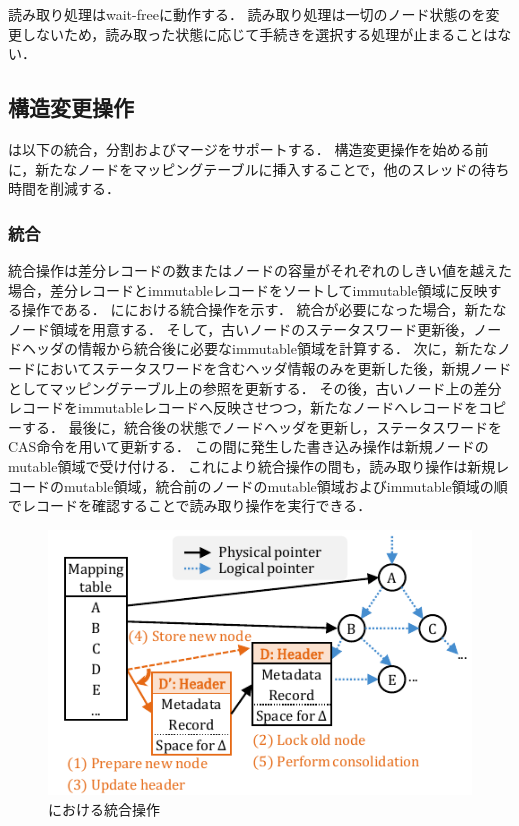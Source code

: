 読み取り処理はwait-freeに動作する．
読み取り処理は一切のノード状態のを変更しないため，読み取った状態に応じて手続きを選択する処理が止まることはない．

\subsection{構造変更操作}

\Bctree{}は以下の統合，分割およびマージをサポートする．
構造変更操作を始める前に，新たなノードをマッピングテーブルに挿入することで，他のスレッドの待ち時間を削減する．

\subsubsection{統合}

統合操作は差分レコードの数またはノードの容量がそれぞれのしきい値を越えた場合，差分レコードとimmutableレコードをソートしてimmutable領域に反映する操作である．
\Fig{\ref{fig:bc_tree_consolidastion}}に\Bctree{}における統合操作を示す．
統合が必要になった場合，新たなノード領域を用意する．
そして，古いノードのステータスワード更新後，ノードヘッダの情報から統合後に必要なimmutable領域を計算する．
次に，新たなノードにおいてステータスワードを含むヘッダ情報のみを更新した後，新規ノードとしてマッピングテーブル上の参照を更新する．
その後，古いノード上の差分レコードをimmutableレコードへ反映させつつ，新たなノードへレコードをコピーする．
最後に，統合後の状態でノードヘッダを更新し，ステータスワードをCAS命令を用いて更新する．
この間に発生した書き込み操作は新規ノードのmutable領域で受け付ける．
これにより統合操作の間も，読み取り操作は新規レコードのmutable領域，統合前のノードのmutable領域およびimmutable領域の順でレコードを確認することで読み取り操作を実行できる．

\begin{figure}[t]
    \centering
    \includegraphics{./figures/Bc-consolidate.pdf}
    \caption{\Bctree{}における統合操作}
    \label{fig:bc_tree_consolidastion}
\end{figure}

